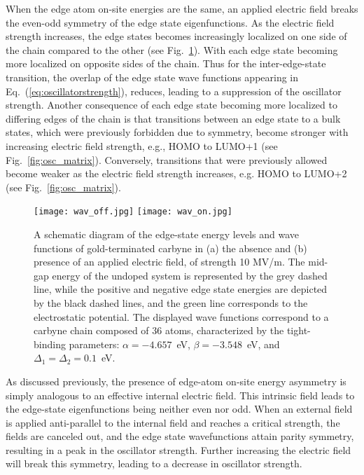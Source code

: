 \documentclass[
preprint,
 amsmath,amssymb,
 aps,
]{revtex4-2}
\begin{document}
When the edge atom on-site energies are the same, an applied electric field breaks the even-odd symmetry of the edge state eigenfunctions. As the electric field strength increases, the edge states becomes increasingly localized on one side of the chain compared to the other (see Fig.~\ref{fig:edge_well_barrier}). With each edge state becoming more localized on opposite sides of the chain. Thus for the inter-edge-state transition, the overlap of the edge state wave functions appearing in Eq.~(\ref{eq:oscillatorstrength}), reduces, leading to a suppression of the oscillator strength. Another consequence of each edge state becoming more localized to differing edges of the chain is that transitions between an edge state to a bulk states, which were previously forbidden due to symmetry, become stronger with increasing electric field strength, e.g., HOMO to LUMO+1 (see Fig.~\ref{fig:osc_matrix}). Conversely, transitions that were previously allowed become weaker as the electric field strength increases, e.g. HOMO to LUMO+2 (see Fig.~\ref{fig:osc_matrix}). 

\begin{figure}
\centering
\texttt{[image: wav\_off.jpg]}
\texttt{[image: wav\_on.jpg]}
\caption{A schematic diagram of the edge-state energy levels and wave functions of gold-terminated carbyne in (a) the absence and (b) presence of an applied electric field, of strength 10 MV/m.  The mid-gap energy of the undoped system is represented by the grey dashed line, while the positive and negative edge state energies are depicted by the black dashed lines, and the green line corresponds to the electrostatic potential. The displayed wave functions correspond to a carbyne chain composed of 36 atoms, characterized by the tight-binding parameters: $\alpha=-4.657$~eV, $\beta=-3.548$~eV, and $\Delta_1=\Delta_2=0.1$~eV.}
\label{fig:edge_well_barrier}
\end{figure}

As discussed previously, the presence of edge-atom on-site energy asymmetry is simply analogous to an effective internal electric field. This intrinsic field leads to the edge-state eigenfunctions being neither even nor odd. 
When an external field is applied anti-parallel to the internal field and reaches a critical strength, the fields are canceled out, and the edge state wavefunctions attain parity symmetry, resulting in a peak in the oscillator strength. Further increasing the electric field will break this symmetry, leading to a decrease in oscillator strength.
\end{document}

